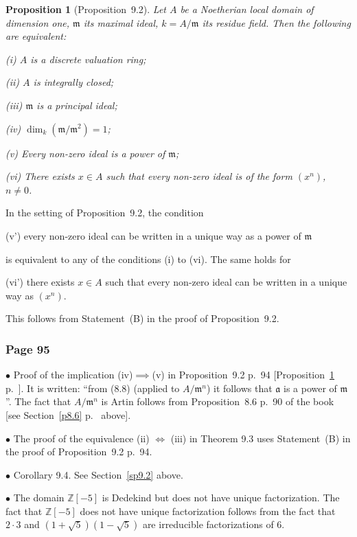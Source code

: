 \documentclass[12pt,letterpaper]{article}%
\newcommand{\mf}{\mathfrak}
\newcommand{\aaa}{\mf a}
\newcommand{\mmm}{\mf m}
\newcommand{\bu}{\bullet}
\newcommand{\nn}{\noindent}
\newtheorem{prop}[thm]{Proposition}
\begin{document}
\begin{prop}[Proposition~9.2]\label{p9.2}
Let $A$ be a Noetherian local domain of dimension one, $\mmm$ its maximal ideal, $k=A/\mmm$ its residue field. Then the following are equivalent:

\nn\emph{(i)} $A$ is a discrete valuation ring; 

\nn\emph{(ii)} $A$ is integrally closed;

\nn\emph{(iii)} $\mmm$ is a principal ideal;

\nn\emph{(iv)} $\dim_k(\mmm/\mmm^2)=1$;

\nn\emph{(v)} Every non-zero ideal is a power of $\mmm$;

\nn\emph{(vi)} There exists $x\in A$ such that every non-zero ideal is of the form $(x^n)$, $n\ne0$.
\end{prop}

In the setting of Proposition~9.2, the condition

(v') every non-zero ideal can be written in a unique way as a power of $\mmm$

\nn is equivalent to any of the conditions (i) to (vi). The same holds for

(vi') there exists $x\in A$ such that every non-zero ideal can be written in a unique way as $(x^n)$.

\nn This follows from Statement~(B) in the proof of Proposition~9.2.

\subsubsection{Page 95}%

\nn$\bu$ Proof of the implication (iv)$\implies$(v) in Proposition~9.2 p.~94 [Proposition~\ref{p9.2} p.~\pageref{p9.2}]. It is written: ``from (8.8) (applied to $A/\mmm^n$) it follows that $\aaa$ is a power of $\mmm$''. The fact that $A/\mmm^n$ is Artin follows from Proposition~8.6 p.~90 of the book [see Section~\ref{p8.6} p.~\pageref{p8.6} above].

\nn$\bu$ The proof of the equivalence (ii) $\iff$ (iii) in Theorem 9.3 uses Statement~(B) in the proof of Proposition~9.2 p.~94.

\nn$\bu$ Corollary 9.4. See Section~\ref{sp9.2} above.

\nn$\bu$ The domain $\mathbb Z[-5]$ is Dedekind but does not have unique factorization. The fact that $\mathbb Z[-5]$ does not have unique factorization follows from the fact that $2\cdot3$ and $(1+\sqrt5)(1-\sqrt5)$ are irreducible factorizations of $6$. 
\end{document}
